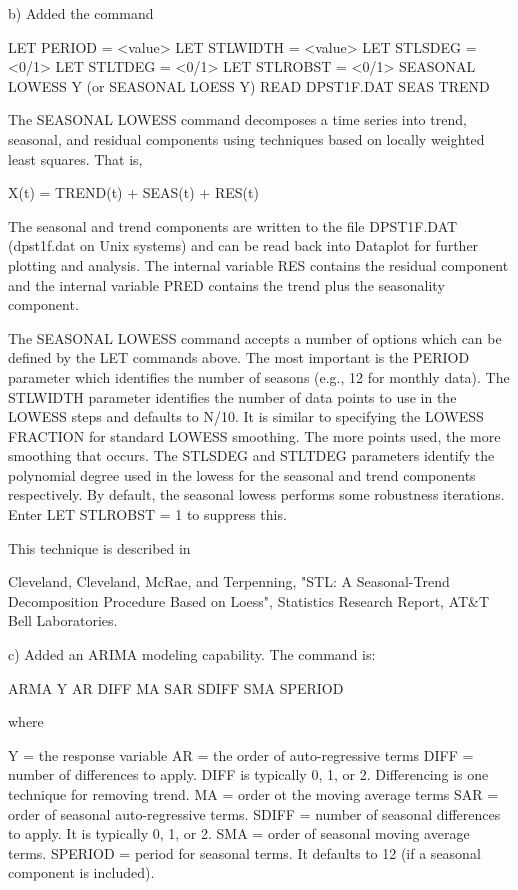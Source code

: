 {    b) Added the command

         LET PERIOD = <value>
         LET STLWIDTH = <value>
         LET STLSDEG = <0/1>
         LET STLTDEG = <0/1>
         LET STLROBST = <0/1>
         SEASONAL LOWESS Y     (or SEASONAL LOESS Y)
         READ DPST1F.DAT SEAS TREND

       The SEASONAL LOWESS command decomposes a time series into
       trend, seasonal, and residual components using techniques
       based on locally weighted least squares.  That is,
      
          X(t) = TREND(t) + SEAS(t) + RES(t)

       The seasonal and trend components are written to the file
       DPST1F.DAT (dpst1f.dat on Unix systems) and can be read
       back into Dataplot for further plotting and analysis.  The
       internal variable RES contains the residual component and
       the internal variable PRED contains the trend plus the
       seasonality component.

       The SEASONAL LOWESS command accepts a number of options
       which can be defined by the LET commands above.  The most
       important is the PERIOD parameter which identifies the number
       of seasons (e.g., 12 for monthly data).  The STLWIDTH
       parameter identifies the number of data points to use
       in the LOWESS steps and defaults to N/10.  It is similar
       to specifying the LOWESS FRACTION for standard LOWESS
       smoothing.  The more points used, the more smoothing that
       occurs.  The STLSDEG and STLTDEG parameters identify the
       polynomial degree used in the lowess for the seasonal and
       trend components respectively.  By default, the seasonal
       lowess performs some robustness iterations.  Enter
       LET STLROBST = 1 to suppress this.

       This technique is described in

           Cleveland, Cleveland, McRae, and Terpenning, "STL: A
           Seasonal-Trend Decomposition Procedure Based on Loess",
           Statistics Research Report, AT&T Bell Laboratories.

    c) Added an ARIMA modeling capability.  The command is:

         ARMA Y AR DIFF MA SAR SDIFF SMA SPERIOD

       where

         Y       = the response variable
         AR      = the order of auto-regressive terms
         DIFF    = number of differences to apply.  DIFF is typically
                   0, 1, or 2.  Differencing is one technique for
                   removing trend.
         MA      = order ot the moving average terms
         SAR     = order of seasonal auto-regressive terms.
         SDIFF   = number of seasonal differences to apply.  It is
                   typically 0, 1, or 2.
         SMA     = order of seasonal moving average terms.
         SPERIOD = period for seasonal terms.  It defaults to 12
                   (if a seasonal component is included).

}
